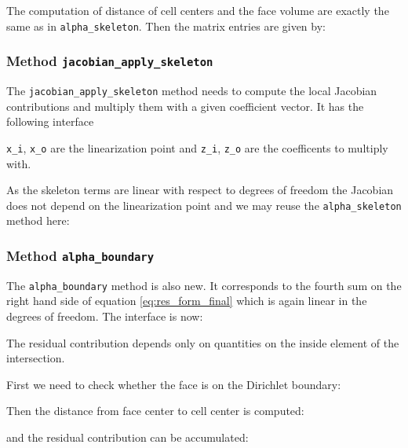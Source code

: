 \documentclass[a4paper,12pt]{article}
\begin{document}
The computation of distance of cell centers and the face volume are
exactly the same as in \lstinline{alpha_skeleton}.
Then the matrix entries are given by:


\subsubsection*{Method \lstinline{jacobian_apply_skeleton}}

The \lstinline{jacobian_apply_skeleton} method needs to 
compute the local Jacobian contributions and multiply them with 
a given coefficient vector. It has the following interface

\lstinline{x_i}, \lstinline{x_o} are the linearization point
and \lstinline{z_i}, \lstinline{z_o} are the coefficents to multiply with.

As the skeleton terms are linear with respect to degrees of freedom
the Jacobian does not depend on the linearization point and
we may reuse the \lstinline{alpha_skeleton} method here:


\subsubsection*{Method \lstinline{alpha_boundary}}

The \lstinline{alpha_boundary} method is also new. It corresponds
to the fourth sum on the right hand side of equation \eqref{eq:res_form_final}
which is again linear in the degrees of freedom.
The interface is now:

The residual contribution depends only on quantities on the inside
element of the intersection.

First we need to check whether the face is on the Dirichlet boundary:


Then the distance from face center to cell center is computed:

and the residual contribution can be accumulated:

\end{document}
